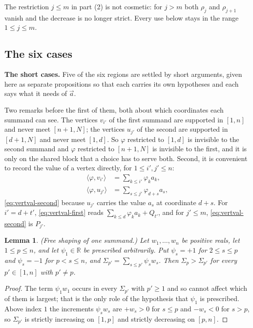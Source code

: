\documentclass[11pt, a4paper, abstract=yes]{scrartcl}
\theoremstyle{definition}
\theoremstyle{remark}
\theoremstyle{plain}
\newtheorem{lemma}[definition]{Lemma}
\begin{document}
The restriction \(j\le m\) in part (2) is not cosmetic: for \(j>m\) both \(\rho_j\) and
\(\rho_{j+1}\) vanish and the decrease is no longer strict. Every use below stays in the range
\(1\le j\le m\).
\subsection{The six cases}
\label{sec-app-cases}
\textbf{The short cases.} Five of the six regions are settled by short arguments, given here as separate
propositions so that each carries its own hypotheses and each says what it needs of \(\vec a\).

Two remarks before the first of them, both about which coordinates each summand can see. The
vertices \(v_{i'}\) of the first summand are supported in \([1,n]\) and never meet \([n+1,N]\); the
vertices \(u_{j'}\) of the second are supported in \([d+1,N]\) and never meet \([1,d]\). So
\(\varphi\) restricted to \([1,d]\) is invisible to the second summand and \(\varphi\) restricted to
\([n+1,N]\) is invisible to the first, and it is only on the shared block that a choice has to serve
both. Second, it is convenient to record the value of a vertex directly, for \(1\le i',j'\le n\):
\begin{align}
  \langle\varphi,v_{i'}\rangle &= \sum_{k\le i'}\varphi_ka_k, \label{eq:vertval-first}\\
  \langle\varphi,u_{j'}\rangle &= \sum_{s\le j'}\varphi_{d+s}a_s, \label{eq:vertval-second}
\end{align}
\eqref{eq:vertval-second} because \(u_{j'}\) carries the value \(a_s\) at coordinate \(d+s\). For
\(i'=d+t'\), \eqref{eq:vertval-first} reads \(\sum_{k\le d}\varphi_ka_k+Q_{t'}\), and for
\(j'\le m\), \eqref{eq:vertval-second} is \(P_{j'}\).

\begin{lemma}
(\emph{Free shaping of one summand.}) Let \(w_1,\dots,w_n\) be positive reals, let \(1\le p\le n\), and
let \(\psi_1\in\mathbb R\) be prescribed arbitrarily. Put \(\psi_s=+1\) for \(2\le s\le p\) and
\(\psi_s=-1\) for \(p<s\le n\), and \(\Sigma_{p'}=\sum_{s\le p'}\psi_sw_s\). Then \(\Sigma_p>\Sigma_{p'}\) for
every \(p'\in[1,n]\) with \(p'\ne p\).
\label{lem-shape}
\end{lemma}

\begin{proof}
The term \(\psi_1w_1\) occurs in every \(\Sigma_{p'}\) with \(p'\ge1\) and so cannot affect which of
them is largest; that is the only role of the hypothesis that \(\psi_1\) is prescribed. Above index
\(1\) the increments \(\psi_sw_s\) are \(+w_s>0\) for \(s\le p\) and \(-w_s<0\) for \(s>p\), so
\(\Sigma_{p'}\) is strictly increasing on \([1,p]\) and strictly decreasing on \([p,n]\).
\end{proof}
\end{document}
